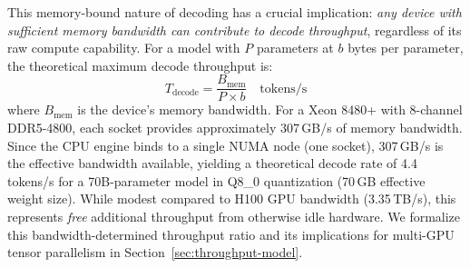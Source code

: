 \documentclass[10pt,conference]{IEEEtran}
\begin{document}
This memory-bound nature of decoding has a crucial implication: \emph{any device with sufficient memory bandwidth can contribute to decode throughput}, regardless of its raw compute capability.
For a model with $P$ parameters at $b$ bytes per parameter, the theoretical maximum decode throughput is:
\begin{equation}
\label{eq:roofline}
T_\text{decode} = \frac{B_\text{mem}}{P \times b} \quad \text{tokens/s}
\end{equation}
where $B_\text{mem}$ is the device's memory bandwidth.
For a Xeon 8480+ with 8-channel DDR5-4800, each socket provides approximately 307\,GB/s of memory bandwidth. Since the CPU engine binds to a single NUMA node (one socket), 307\,GB/s is the effective bandwidth available, yielding a theoretical decode rate of 4.4\,tokens/s for a 70B-parameter model in Q8\_0 quantization (70\,GB effective weight size).
While modest compared to H100 GPU bandwidth (3.35\,TB/s), this represents \emph{free} additional throughput from otherwise idle hardware.
We formalize this bandwidth-determined throughput ratio and its implications for multi-GPU tensor parallelism in Section~\ref{sec:throughput-model}.
\end{document}
